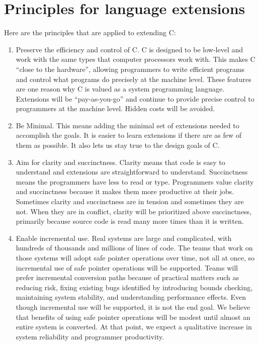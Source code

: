 
\chapter{Principles for language extensions}\label{principles-for-language-extensions}

Here are the principles that are applied to extending C:

\begin{enumerate}
\item
  Preserve the efficiency and control of C. C is designed to be
  low-level and work with the same types that computer processors work
  with. This makes C ``close to the hardware'', allowing programmers to
  write efficient programs and control what programs do precisely at the
  machine level. These features are one reason why C is valued as a
  system programming language. Extensions will be ``pay-as-you-go'' and
  continue to provide precise control to programmers at the machine
  level. Hidden costs will be avoided.
\item
  Be Minimal. This means adding the minimal set of extensions needed to
  accomplish the goals. It is easier to learn extensions if there are as
  few of them as possible. It also lets us stay true to the design goals
  of C.
\item
  Aim for clarity and succinctness. Clarity means that code is easy to
  understand and extensions are straightforward to understand.
  Succinctness means the programmers have less to read or type.
  Programmers value clarity and succinctness because it makes them more
  productive at their jobs. Sometimes clarity and succinctness are in
  tension and sometimes they are not. When they are in conflict, clarity
  will be prioritized above succinctness, primarily because source code
  is read many more times than it is written.
\item
  Enable incremental use. Real systems are large and complicated, with
  hundreds of thousands and millions of lines of code. The teams that
  work on those systems will adopt safe pointer operations over time,
  not all at once, so incremental use of safe pointer operations will be
  supported. Teams will prefer incremental conversion paths because of
  practical matters such as reducing risk, fixing existing bugs
  identified by introducing bounds checking, maintaining system
  stability, and understanding performance effects. Even though
  incremental use will be supported, it is not the end goal. We believe
  that benefits of using safe pointer operations will be modest until
  almost an entire system is converted. At that point, we expect a
  qualitative increase in system reliability and programmer
  productivity.
\end{enumerate}

